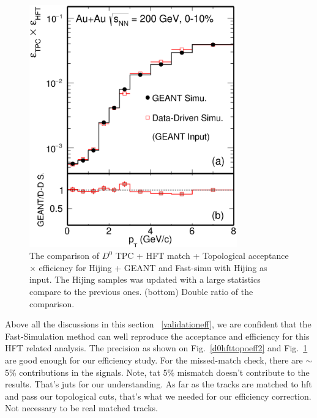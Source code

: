 \begin{figure}[htbp]
\centering
\includegraphics[keepaspectratio,width=0.8\textwidth,angle=0]{figure/Run14_D0HFT/Mcd0Eff_0_10.eps}
\caption{The comparison of $D^0$ TPC + HFT match + Topological acceptance $\times$ efficiency for Hijing + GEANT and Fast-simu with Hijing as input. The Hijing samples was updated with a large statistics compare to the previous ones. (bottom) Double ratio of the comparison.}
\label{d0hfttopoeff_hijing_0_10}
\end{figure}


Above all the discussions in this section ~\ref{validationeff}, we are confident that the Fast-Simulation method can well reproduce the acceptance and efficiency for this HFT related analysis. The precision as shown on Fig.~\ref{d0hfttopoeff2} and Fig.~\ref{d0hfttopoeff_hijing_0_10} are good enough for our efficiency study. For the missed-match check, there are $\sim$5\% contributions in the signals.
Note, tat 5\% mismatch doesn't contribute to the results. That's juts for our understanding. As far as the tracks are matched to hft and pass our topological cuts, that's what we needed for our efficiency correction. Not necessary to be real matched tracks.

